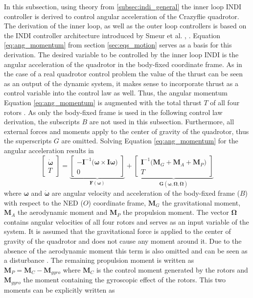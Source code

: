 \documentclass[11pt, a4paper, twoside]{report}
\begin{document}
In this subsection, using theory from \ref{subsec:indi_general} the inner loop \acrshort{INDI} controller is derived to control angular acceleration of the Crazyflie quadrotor. The derivation of the inner loop, as well as the outer loop controllers is based on the \acrshort{INDI} controller architecture introduced by Smeur et al. \cite{Smeur1}, \cite{Smeur2}. Equation \ref{eq:ang_momentum} from section \ref{sec:eqs_motion} serves as a basis for this derivation. The desired variable to be controlled by the inner loop \acrshort{INDI} is the angular acceleration of the quadrotor in the body-fixed coordinate frame. As in the case of a real quadrotor control problem the value of the thrust can be seen as an output of the dynamic system, it makes sense to incorporate thrust as a control variable into the control law as well. Thus, the angular momentum Equation \ref{eq:ang_momentum} is augmented with the total thrust $T$ of all four rotors \cite{Smeur2}. As only the body-fixed frame is used in the following control law derivation, the subscripts $B$ are not used in this subsection. Furthermore, all external forces and moments apply to the center of gravity of the quadrotor, thus the superscripts $G$ are omitted. 
Solving Equation \ref{eq:ang_momentum} for the angular acceleration results in
\begin{equation}
	\begin{bmatrix}
		\dot{\bm{\omega}}\\
		T
	\end{bmatrix} = 
	\underbrace{
	\begin{bmatrix}
		-\bm{I}^{-1} \big(\bm{\omega} \times \bm{I} \bm{\omega} \big)\\
		0
	\end{bmatrix}}_\text{$\bm{F}(\bm{\omega})$} +
	\underbrace{	
	\begin{bmatrix}
		\bm{I}^{-1} \big( \bm{M}_G + \bm{M}_{A} +  \bm{M}_{P} \big)\\
		T
	\end{bmatrix}}_\text{$\bm{G}(\bm{\omega}, \bm{\Omega}, \bm{\dot{\Omega}})$}
	\label{eq:main_eom_indi_inner}
\end{equation}
where $\bm{\omega}$ and $\dot{\bm{\omega}}$ are angular velocity and acceleration of the body-fixed frame ($B$) with respect to the \acrshort{NED} ($O$) coordinate frame, $\bm{M}_G$ the gravitational moment, $\bm{M}_A$ the aerodynamic moment and $\bm{M}_P$ the propulsion moment. The vector $\bm{\Omega}$ contains angular velocities of all four rotors and serves as an input variable of the system. It is assumed that the gravitational force is applied to the center of gravity of the quadrotor and does not cause any moment around it. Due to the absence of the aerodynamic moment this term is also omitted and can be seen as a disturbance \cite{Smeur1}. The remaining propulsion moment is written as $\bm{M}_P=\bm{M}_C-\bm{M}_{gyro}$ where $\bm{M}_C$ is the control moment generated by the rotors and $\bm{M}_{gyro}$ the moment containing the gyroscopic effect of the rotors. This two moments can be explicitly written as
\end{document}
